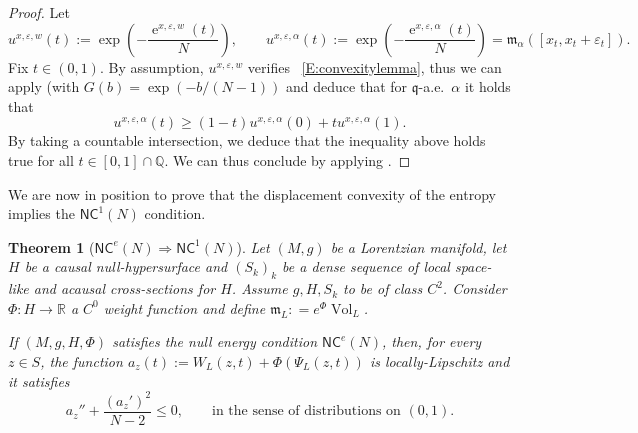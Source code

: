 \documentclass[12pt,a4paper]{amsart}
\theoremstyle{plain}
\newtheorem{theorem}[lemma]{Theorem}
\theoremstyle{definition}
\numberwithin{equation}{section}
\let\temp\phi
\let\phi\varphi
\let\temp\epsilon
\let\epsilon\varepsilon
\let\varepsilon\temp
\newcommand{\R}{\mathbb{R}}
\newcommand{\Q}{\mathbb{Q}}
\DeclareMathOperator{\ee}{e}
\DeclareMathOperator{\vol}{Vol}
\newcommand{\NC}{\mathsf{NC}}
\newcommand{\q}{\mathfrak{q}}
\newcommand{\gflow}{\Psi}
\newcommand{\mm}{\mathfrak m}
\begin{document}
\begin{proof}
  Let
  \begin{equation*}
    u^{x,\epsilon,w}(t)
    :=
    \exp
    \left(
      -
      \frac{\ee^{x,\epsilon,w}(t)}{N}
    \right)
    ,
    \qquad
    u^{x,\epsilon,\alpha}(t)
    :=
    \exp
    \left(
      -
      \frac{\ee^{x,\epsilon,\alpha}(t)}{N}
    \right)
    =
    \mm_\alpha([x_t,x_t+\epsilon_t])
    .
  \end{equation*}
  Fix $t\in(0,1)$.
  By assumption, $u^{x,\epsilon,w}$ verifies
 ~\eqref{E:convexitylemma}, thus we can apply
   (with $G(b)=\exp(-b/(N-1))$ and deduce  that for $\q$-a.e.\ $\alpha$ it
  holds that
  \begin{equation*}
    u^{x,\epsilon,\alpha}(t)
    \geq
    (1-t)
    u^{x,\epsilon,\alpha}(0)
    +
    t
    u^{x,\epsilon,\alpha}(1)
    .
  \end{equation*}
  By taking a countable intersection, we deduce that the inequality
  above holds true for all $t\in[0,1]\cap \Q$.
  We can thus conclude by applying .
\end{proof}


We are now in position to prove that the displacement convexity of the entropy implies the $\NC^1(N)$ condition.


\begin{theorem}[$\NC^e(N)\Rightarrow\NC^1(N)$]
  \label{th:entropic-to-distributional}
  Let $(M,g)$ be a Lorentzian manifold, let $H$ be a causal null-hypersurface and $(S_k)_k$
be a dense sequence of local space-like and acausal cross-sections   
for $H$. Assume $g,H,S_k$ to be of class $C^2$.
  Consider $\Phi:H \to \R$ a $C^0$
  weight function and define $\mm_L : =e^{\Phi}\vol_L$.

If $(M,g,H, \Phi)$ satisfies the null energy condition $\NC^e(N)$,
then, for every $z\in S$, the function
$a_z(t):=W_{L}(z,t)+\Phi(\gflow_L(z,t))$  is locally-Lipschitz and it satisfies
\begin{equation}
  \label{eq:convexity-density}
  a_z''
  +
  \frac{(a_z')^2}{N-2}
  \leq 0, \qquad \text{in the sense of distributions on $(0,1)$.}
\end{equation}
\end{theorem}
\end{document}
